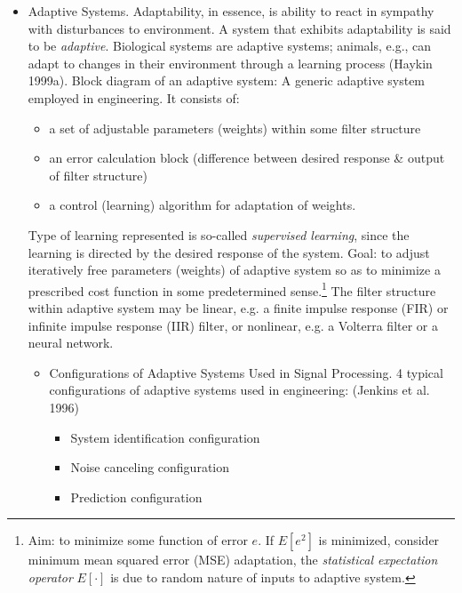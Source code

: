 \documentclass{article}
\begin{document}
\begin{enumerate}
\begin{itemize}
\begin{itemize}
			{\sf Chap Summary.} Introduce fundamentals of adaptive systems. Emphasis is 1st placed upon various structures available for adaptive signal processing, \& includes  which is focus of this book. Detail basic learning algorithms \& concepts in context of linear \& nonlinear structure filters \& networks. Discuss issue of modularity.
			\item {\sf Adaptive Systems.} Adaptability, in essence, is ability to react in sympathy with disturbances to environment. A system that exhibits adaptability is said to be {\it adaptive}. Biological systems are adaptive systems; animals, e.g., can adapt to changes in their environment through a learning process (Haykin 1999a). {\sf Block diagram of an adaptive system}: A generic adaptive system employed in engineering. It consists of:
			\begin{itemize}
				\item a set of adjustable parameters (weights) within some filter structure
				\item an error calculation block (difference between desired response \& output of filter structure)
				\item a control (learning) algorithm for adaptation of weights.
			\end{itemize}
			Type of learning represented is so-called {\it supervised learning}, since the learning is directed by the desired response of the system. Goal: to adjust iteratively free parameters (weights) of adaptive system so as to minimize a prescribed cost function in some predetermined sense.\footnote{Aim: to minimize some function of error $e$. If $E[e^2]$ is minimized, consider minimum mean squared error (MSE) adaptation, the {\it statistical expectation operator} $E[\cdot]$ is due to random nature of inputs to adaptive system.} The filter structure within adaptive system may be linear, e.g. a finite impulse response (FIR) or infinite impulse response (IIR) filter, or nonlinear, e.g. a Volterra filter or a neural network.
			\begin{itemize}
				\item {\sf Configurations of Adaptive Systems Used in Signal Processing.} 4 typical configurations of adaptive systems used in engineering: (Jenkins et al. 1996)
				\begin{itemize}
					\item System identification configuration
					\item Noise canceling configuration
					\item Prediction configuration

\end{itemize}
\end{itemize}
\end{itemize}
\end{itemize}
\end{enumerate}
\end{document}
